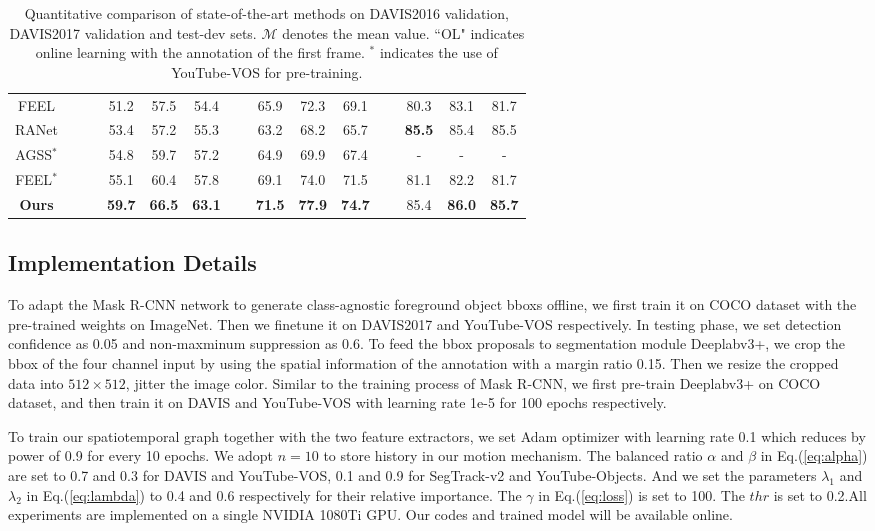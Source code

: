 \documentclass[letterpaper]{article} %
\newcommand{\xmark}{\ding{56}}%
\begin{document}
\begin{table}
\begin{tabular}{c|c|cccccccccccc}
FEEL \cite{voigtlaender2019feelvos} & \xmark & \ & 51.2 & 57.5 & 54.4 & \ & 65.9 & 72.3 & 69.1 & \ & 80.3 & 83.1 & 81.7 \\
RANet \cite{wang2019ranet} & \xmark & \ & 53.4 & 57.2 & 55.3 & \ & 63.2 & 68.2 & 65.7 & \ & \textbf{85.5} & 85.4 & 85.5 \\
AGSS$^*$ \cite{lin2019agss} & \xmark & \ & 54.8 & 59.7 & 57.2 & \ & 64.9 & 69.9 & 67.4 & \ & - & - & - \\
FEEL$^*$ \cite{voigtlaender2019feelvos} & \xmark & \ & 55.1 & 60.4 & 57.8 & \ & 69.1 & 74.0 & 71.5 & \ & 81.1 & 82.2 & 81.7 \\ \hline
\textbf{Ours} & \xmark & \ & \textbf{59.7} & \textbf{66.5} & \textbf{63.1} & \ & \textbf{71.5} & \textbf{77.9} & \textbf{74.7} & \ & 85.4 & \textbf{86.0} & \textbf{85.7}
\\ \hline
\end{tabular}
\caption{Quantitative comparison of state-of-the-art methods on DAVIS2016 validation, DAVIS2017 validation and test-dev sets. $\mathcal{M}$ denotes the mean value. ``OL" indicates online learning with the annotation of the first frame. $^*$ indicates the use of YouTube-VOS for pre-training.}
\label{tab:davis}
\end{table}

\subsection{Implementation Details}
To adapt the Mask R-CNN network to generate class-agnostic foreground object bboxs offline, we first train it on COCO dataset with the pre-trained weights on ImageNet. Then we finetune it on DAVIS2017 and YouTube-VOS respectively. In testing phase, we set detection confidence as 0.05 and non-maxminum suppression as 0.6.
To feed the bbox proposals to segmentation module Deeplabv3+, we crop the bbox of the four channel input by using the spatial information of the annotation with a margin ratio 0.15. Then we resize the cropped data into $512 \times 512$, jitter the image color. Similar to the training process of Mask R-CNN, we first pre-train Deeplabv3+ on COCO dataset, and then train it on DAVIS and YouTube-VOS with learning rate 1e-5 for 100 epochs respectively.

To train our spatiotemporal graph together with the two feature extractors, we set Adam optimizer with learning rate 0.1 which reduces by power of 0.9 for every 10 epochs. We adopt $n=10$ to store history in our motion mechanism. The balanced ratio $\alpha$ and $\beta$ in Eq.(\ref{eq:alpha}) are set to 0.7 and 0.3 for DAVIS and YouTube-VOS, 0.1 and 0.9 for SegTrack-v2 and YouTube-Objects. And we set the parameters $\lambda_1$ and $\lambda_2$ in Eq.(\ref{eq:lambda}) to 0.4 and 0.6 respectively for their relative importance. The $\gamma$ in Eq.(\ref{eq:loss}) is set to 100. The $thr$ is set to 0.2.All experiments are implemented on a single NVIDIA 1080Ti GPU. Our codes and trained model will be available online.
\end{document}
